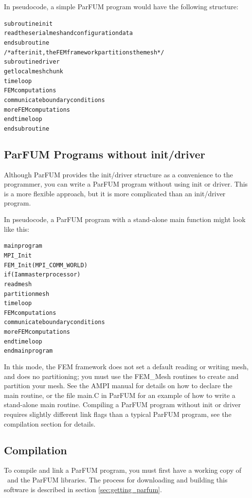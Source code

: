 In pseudocode, a simple ParFUM program would have the following structure:

\begin{alltt}
     subroutine init
          read the serial mesh and configuration data
     end subroutine
/* after init, the FEM framework partitions the mesh */
     subroutine driver
          get local mesh chunk
          time loop
               FEM computations
               communicate boundary conditions
               more FEM computations
          end time loop
     end subroutine
\end{alltt}

\subsection{ParFUM Programs without init/driver}

Although ParFUM provides the init/driver structure as a convenience to the programmer, you can write a ParFUM program without using init or driver. This is a more flexible approach, but it is more complicated than an init/driver program.

In pseudocode, a ParFUM program with a stand-alone main function might look like this:

\begin{alltt}
   main program
      MPI_Init
      FEM_Init(MPI_COMM_WORLD)
      if (I am master processor)
         read mesh
      partition mesh
      time loop
          FEM computations
          communicate boundary conditions
          more FEM computations
      end time loop
   end main program
\end{alltt}


In this mode, the FEM framework does not set a default reading or writing mesh, and does no partitioning; you must use the FEM\_Mesh routines to create and 
partition your mesh. See the AMPI manual for details on how to declare
the main routine, or the file main.C in ParFUM for an example of how to write a stand-alone main routine. Compiling a ParFUM program without init or driver requires slightly different link flags than a typical ParFUM program, see the compilation section for details.


\subsection{Compilation}

To compile and link a ParFUM program, you must first have a working copy of \charmpp\ and the ParFUM libraries. The process for downloading and building this software is described in section \ref{sec:getting_parfum}.

